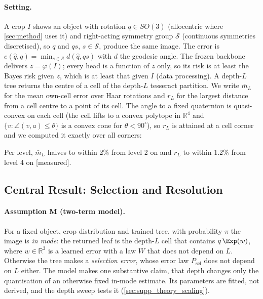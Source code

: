\paragraph{Setting.}
A crop $I$ shows an object with rotation $q\in SO(3)$ (allocentric where \cref{sec:method} uses it) and right-acting symmetry
group $\mathcal S$ (continuous symmetries discretised), so $q$ and $qs$, $s\in\mathcal S$, produce the same image. The error
is $e(\hat q,q)=\min_{s\in\mathcal S} d(\hat q,qs)$ with $d$ the geodesic angle. The frozen backbone delivers $z=\varphi(I)$;
every head is a function of $z$ only, so its risk is at least the Bayes risk given $z$, which is at least that given $I$
(data processing). A depth-$L$ tree returns the centre of a cell of the depth-$L$ tesseract partition. We write
$\bar m_L$ for the mean own-cell error over Haar rotations and $r_L$ for the largest distance from a cell centre to a point of
its cell. The angle to a fixed quaternion is quasi-convex on each cell (the cell lifts to a convex polytope in $\mathbb R^4$
and $\{v:\angle(v,a)\le\theta\}$ is a convex cone for $\theta<90^\circ$), so $r_L$ is attained at a cell corner and we
computed it exactly over all corners:

\begin{center}\scriptsize\setlength{\tabcolsep}{4pt}
\end{center}
Per level, $\bar m_L$ halves to within 2\% from level 2 on and $r_L$ to within 1.2\% from level 4 on [measured].

\subsection{Central Result: Selection and Resolution}

\paragraph{Assumption M (two-term model).}
For a fixed object, crop distribution and trained tree, with probability $\pi$ the image is \emph{in mode}: the returned leaf
is the depth-$L$ cell that contains $q\,\Exp(w)$, where $w\in\mathbb R^3$ is a learned error with a law $W$ that does not depend
on $L$. Otherwise the tree makes a \emph{selection error}, whose error law $P_{\mathrm{sel}}$ does not depend on $L$ either.
The model makes one substantive claim, that depth changes only the quantisation of an otherwise fixed in-mode estimate. Its
parameters are fitted, not derived, and the depth sweep tests it (\cref{sec:supp_theory_scaling}).

